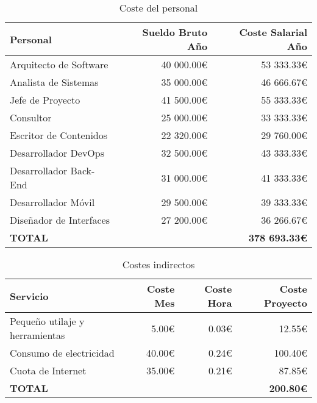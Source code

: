 \begin{table}[H]
    \centering
    \begin{tabular}{l r r}
        \hline
        Personal & Sueldo Bruto Año & Coste Salarial Año \\
        \hline
        Arquitecto de Software & 40 000.00€ & 53 333.33€ \\  
        Analista de Sistemas & 35 000.00€ & 46 666.67€ \\  
        Jefe de Proyecto & 41 500.00€ & 55 333.33€ \\  
        Consultor & 25 000.00€ & 33 333.33€ \\  
        Escritor de Contenidos & 22 320.00€ & 29 760.00€ \\  
        Desarrollador DevOps & 32 500.00€ & 43 333.33€ \\  
        Desarrollador Back-End & 31 000.00€ & 41 333.33€ \\  
        Desarrollador Móvil & 29 500.00€ & 39 333.33€ \\  
        Diseñador de Interfaces & 27 200.00€ & 36 266.67€ \\  
        \hline
        \textbf{TOTAL}               & & \textbf{378 693.33€} \\
    \end{tabular}
    \caption{Coste del personal}
    \label{pre:personal}
\end{table}

\begin{table}[H]
    \centering
    \begin{tabular}{l r r r}
        \hline
        Servicio & Coste Mes & Coste Hora & Coste Proyecto \\
        \hline
        Pequeño utilaje y herramientas & 5.00€ & 0.03€ & 12.55€ \\  
        Consumo de electricidad & 40.00€ & 0.24€ & 100.40€ \\  
        Cuota de Internet & 35.00€ & 0.21€ & 87.85€ \\   
        \hline
        \textbf{TOTAL}               & & & \textbf{200.80€} \\
    \end{tabular}
    \caption{Costes indirectos}
    \label{pre:costes_indirectos}
\end{table}

